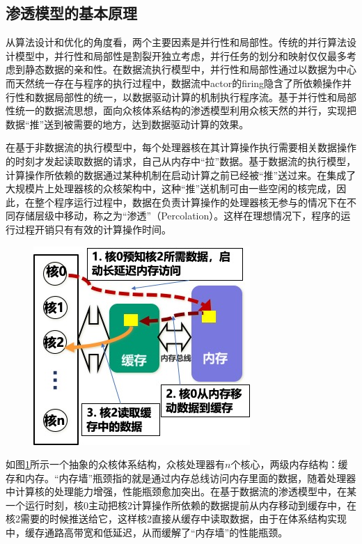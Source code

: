 \begin{flushleft}
\subsection{渗透模型的基本原理}\label{sec:percolation_what}
从算法设计和优化的角度看，两个主要因素是并行性和局部性。传统的并行算法设计模型中，并行性和局部性是割裂开独立考虑，并行任务的划分和映射仅仅最多考虑到静态数据的亲和性。在数据流执行模型中，并行性和局部性通过以数据为中心而天然统一存在与程序的执行过程中，数据流中actor的firing隐含了所依赖操作并行性和数据局部性的统一，以数据驱动计算的机制执行程序流。基于并行性和局部性统一的数据流思想，面向众核体系结构的渗透模型利用众核天然的并行，实现把数据“推”送到被需要的地方，达到数据驱动计算的效果。

在基于非数据流的执行模型中，每个处理器核在其计算操作执行需要相关数据操作的时刻才发起读取数据的请求，自己从内存中“拉”数据。基于数据流的执行模型，计算操作所依赖的数据通过某种机制在启动计算之前已经被“推”送过来。在集成了大规模片上处理器核的众核架构中，这种“推”送机制可由一些空闲的核完成，因此，在整个程序运行过程中，数据在负责计算操作的处理器核无参与的情况下在不同存储层级中移动，称之为“渗透”（Percolation）。这样在理想情况下，程序的运行过程开销只有有效的计算操作时间。

\begin{figure}[!htbp]
	\centering
	\includegraphics[clip, scale=0.6]{Img/Chap_Algorithm/percolation_what}
	\label{fig:percolation_what}
\end{figure}

如图\ref{fig:percolation_what}所示一个抽象的众核体系结构，众核处理器有$n$个核心，两级内存结构：缓存和内存。“内存墙”瓶颈指的就是通过内存总线访问内存里面的数据，随着处理器中计算核的处理能力增强，性能瓶颈愈加突出。在基于数据流的渗透模型中，在某一个运行时刻，核0主动把核2计算操作所依赖的数据提前从内存移动到缓存中，在核2需要的时候推送给它，这样核2直接从缓存中读取数据，由于在体系结构实现中，缓存通路高带宽和低延迟，从而缓解了“内存墙”的性能瓶颈。


\end{flushleft}
